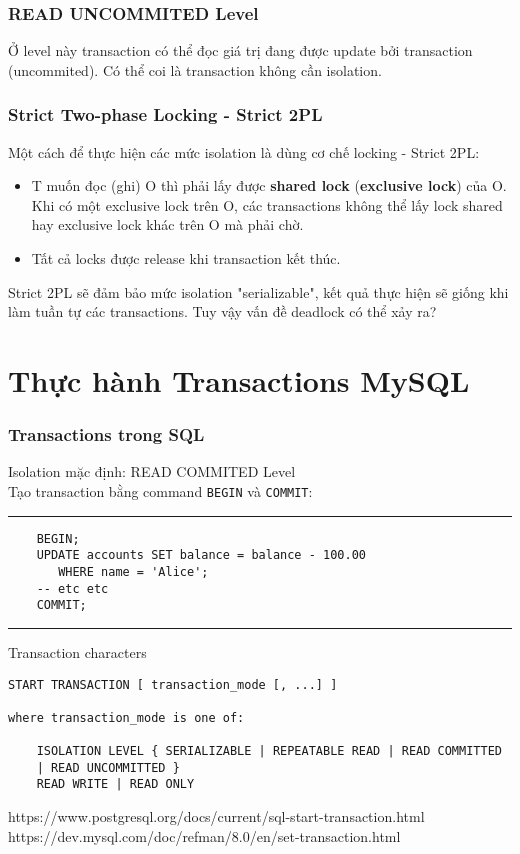 \documentclass[xcolor={table, dvipsnames}]{beamer}
\begin{document}
\begin{frame}
\frametitle{READ UNCOMMITED Level}
Ở level này transaction có thể đọc giá trị đang được update bởi transaction (uncommited). Có thể coi là transaction không cần isolation.
\end{frame}

\begin{frame}
\frametitle{Strict Two-phase Locking - Strict 2PL}
Một cách để thực hiện các mức isolation là dùng cơ chế locking - Strict 2PL:
\begin{itemize}
\item T muốn đọc (ghi) O thì phải lấy được \textbf{shared lock} (\textbf{exclusive lock}) của O. Khi có một exclusive lock trên O, các transactions không thể lấy lock shared hay exclusive lock khác trên O mà phải chờ.
\item Tất cả locks được release khi transaction kết thúc.
\end{itemize}
Strict 2PL sẽ đảm bảo mức isolation "serializable", kết quả thực hiện sẽ giống khi làm tuần tự các transactions. Tuy vậy vấn đề deadlock có thể xảy ra?
\end{frame}

\section{Thực hành Transactions MySQL}
\begin{frame}[fragile]
\frametitle{Transactions trong SQL}
Isolation mặc định: READ COMMITED Level\\
Tạo transaction bằng command \verb|BEGIN| và \verb|COMMIT|:
\rule{\textwidth}{1pt}
\scriptsize
\begin{verbatim}
    BEGIN;
    UPDATE accounts SET balance = balance - 100.00
       WHERE name = 'Alice';
    -- etc etc
    COMMIT;
\end{verbatim}
\rule{\textwidth}{1pt}

\begin{block}{Transaction characters}
\begin{verbatim}
START TRANSACTION [ transaction_mode [, ...] ]

where transaction_mode is one of:

    ISOLATION LEVEL { SERIALIZABLE | REPEATABLE READ | READ COMMITTED 
    | READ UNCOMMITTED }
    READ WRITE | READ ONLY
\end{verbatim}
    
https://www.postgresql.org/docs/current/sql-start-transaction.html\\
https://dev.mysql.com/doc/refman/8.0/en/set-transaction.html
\end{block}
\end{frame}
\end{document}

